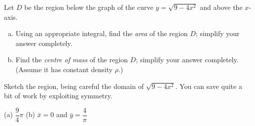 \begin{Mquestion}[2015A]
Let $D$ be the region below the graph of the curve $y=\sqrt{9-4x^2}$ and above the $x$-axis.
\begin{enumerate}[(a)]
\item
Using an appropriate integral, find the {\em area} of the region $D$; simplify your answer completely.
\item
Find the {\em centre of mass} of the region $D$; simplify your answer completely. (Assume it has constant density $\rho$.)
\end{enumerate}
\end{Mquestion}

\begin{hint}
Sketch the region, being careful the domain of $\sqrt{9-4x^2}$.
You can save quite a bit of work by exploiting symmetry.
\end{hint}

\begin{answer} (a)
$\dfrac{9}{4}\pi$
\qquad (b)
$\bar x = 0$ and $\bar y = \dfrac{4}{\pi}$


\end{answer}

